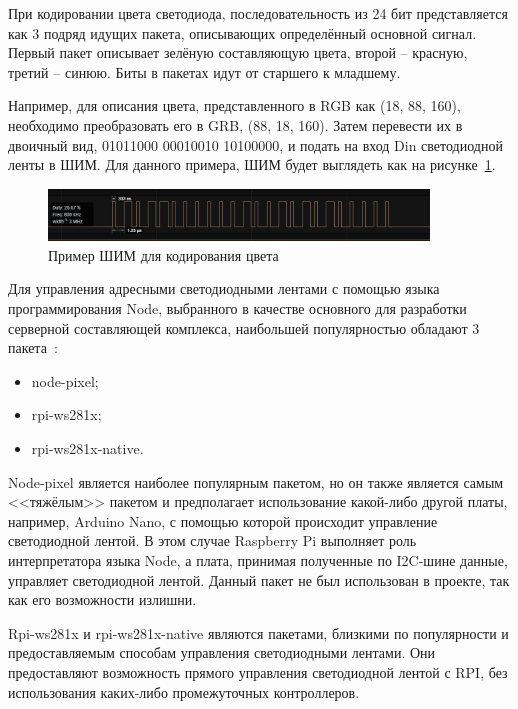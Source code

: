 При кодировании цвета светодиода, последовательность из 24 бит представляется как 3 подряд идущих пакета, описывающих определённый основной сигнал. Первый пакет описывает зелёную составляющую цвета, второй -- красную, третий -- синюю. Биты в пакетах идут от старшего к младшему.

Например, для описания цвета, представленного в RGB как (18, 88, 160), необходимо преобразовать его в GRB, (88, 18, 160). Затем перевести их в двоичный вид, 01011000 00010010 10100000, и подать на вход Din светодиодной ленты в ШИМ. Для данного примера, ШИМ будет выглядеть как на рисунке~\ref{img:WS2812__PWM_example}.

\begin{figure}[H]
  \centering
  \includegraphics[width=0.9\textwidth]{assets/images/practical/PWM__example.jpg}
  \caption{Пример ШИМ для кодирования цвета}
  \label{img:WS2812__PWM_example}
\end{figure}

Для управления адресными светодиодными лентами с помощью языка программирования Node, выбранного в качестве основного для разработки серверной составляющей комплекса, наибольшей популярностью обладают 3 пакета~\cite{npm}:

\begin{itemize}
  \item node-pixel;
  \item rpi-ws281x;
  \item rpi-ws281x-native.
\end{itemize}

Node-pixel является наиболее популярным пакетом, но он также является самым <<тяжёлым>> пакетом и предполагает использование какой-либо другой платы, например, Arduino Nano, с помощью которой происходит управление светодиодной лентой. В этом случае Raspberry Pi выполняет роль интерпретатора языка Node, а плата, принимая полученные по I2C-шине данные, управляет светодиодной лентой. Данный пакет не был использован в проекте, так как его возможности излишни.

Rpi-ws281x и rpi-ws281x-native являются пакетами, близкими по популярности и предоставляемым способам управления светодиодными лентами. Они предоставляют возможность прямого управления светодиодной лентой с RPI, без использования каких-либо промежуточных контроллеров.


